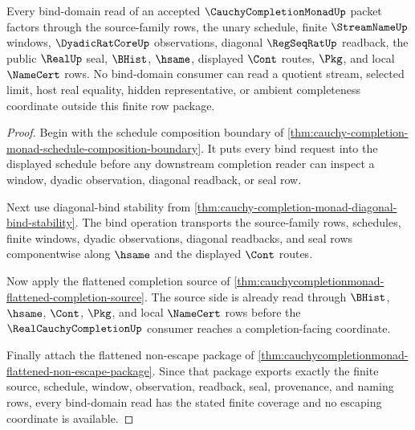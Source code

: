 \begin{theorem}
\label{thm:cauchy-completion-monad-finite-bind-domain-coverage}
Every bind-domain read of an accepted $\CauchyCompletionMonadUp$ packet factors through the source-family rows, the unary schedule, finite $\StreamNameUp$ windows, $\DyadicRatCoreUp$ observations, diagonal $\RegSeqRatUp$ readback, the public $\RealUp$ seal, $\BHist$, $\hsame$, displayed $\Cont$ routes, $\Pkg$, and local $\NameCert$ rows. No bind-domain consumer can read a quotient stream, selected limit, host real equality, hidden representative, or ambient completeness coordinate outside this finite row package.
\end{theorem}
\begin{proof}
Begin with the schedule composition boundary of \autoref{thm:cauchy-completion-monad-schedule-composition-boundary}. It puts every bind request into the displayed schedule before any downstream completion reader can inspect a window, dyadic observation, diagonal readback, or seal row.

Next use diagonal-bind stability from \autoref{thm:cauchy-completion-monad-diagonal-bind-stability}. The bind operation transports the source-family rows, schedules, finite windows, dyadic observations, diagonal readbacks, and seal rows componentwise along $\hsame$ and the displayed $\Cont$ routes.

Now apply the flattened completion source of \autoref{thm:cauchycompletionmonad-flattened-completion-source}. The source side is already read through $\BHist$, $\hsame$, $\Cont$, $\Pkg$, and local $\NameCert$ rows before the $\RealCauchyCompletionUp$ consumer reaches a completion-facing coordinate.

Finally attach the flattened non-escape package of \autoref{thm:cauchycompletionmonad-flattened-non-escape-package}. Since that package exports exactly the finite source, schedule, window, observation, readback, seal, provenance, and naming rows, every bind-domain read has the stated finite coverage and no escaping coordinate is available.
\end{proof}

